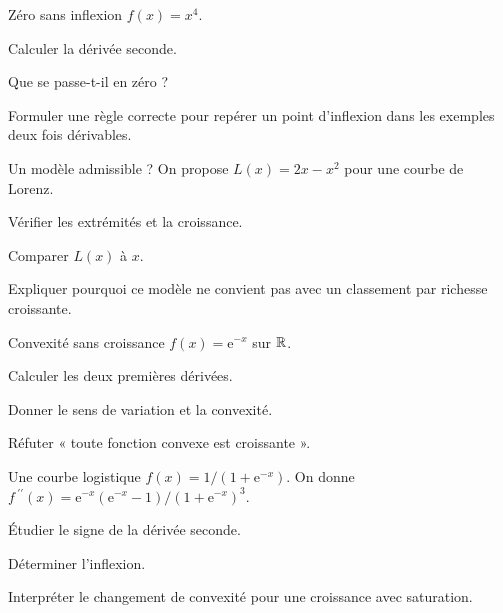 \begingroup\renewcommand{\otBesoinPlace}[1]{}\begin{minipage}{\linewidth}
\begin{exercice}[3]{Zéro sans inflexion}
$f(x)=x^4$.
\begin{questions}
\item Calculer la dérivée seconde.
\item Que se passe-t-il en zéro ?
\item Formuler une règle correcte pour repérer un point d’inflexion dans les exemples deux fois dérivables.
\end{questions}
\end{exercice}
\begin{exercice}[3]{Un modèle admissible ?}
On propose $L(x)=2x-x^2$ pour une courbe de Lorenz.
\begin{questions}
\item Vérifier les extrémités et la croissance.
\item Comparer $L(x)$ à $x$.
\item Expliquer pourquoi ce modèle ne convient pas avec un classement par richesse croissante.
\end{questions}
\end{exercice}
\begin{exercice}[3]{Convexité sans croissance}
$f(x)=\mathrm e^{-x}$ sur $\mathbb{R}$.
\begin{questions}
\item Calculer les deux premières dérivées.
\item Donner le sens de variation et la convexité.
\item Réfuter « toute fonction convexe est croissante ».
\end{questions}
\end{exercice}
\begin{exercice}[3]{Une courbe logistique}
$f(x)=1/(1+\mathrm e^{-x})$. On donne $f\,\!^{\prime\prime}(x)=\mathrm e^{-x}(\mathrm e^{-x}-1)/(1+\mathrm e^{-x})^3$.
\begin{questions}
\item Étudier le signe de la dérivée seconde.
\item Déterminer l’inflexion.
\item Interpréter le changement de convexité pour une croissance avec saturation.
\end{questions}
\end{exercice}
\end{minipage}\endgroup
